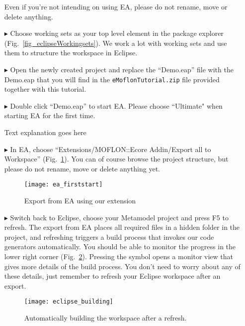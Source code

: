 \begin{enumerate}
\vspace{1cm}
Even if you're not intending on using EA, please do not rename, move or delete anything.

\FloatBarrier
\item[$\blacktriangleright$] Choose working sets as your top level element in the package explorer (Fig.~\ref{fig_eclipseWorkingsets}).
We work a lot with working sets and use them to structure the workspace in Eclipse.

\item[$\blacktriangleright$] Open the newly created project and replace the ``Demo.eap'' file with the Demo.eap that you will find in the \texttt{eMoflonTutorial.zip} file provided together with this tutorial.

\item[$\blacktriangleright$] Double click ``Demo.eap'' to start EA.
Please choose ``Ultimate" when starting EA for the first time.

\newpage
\texHeader
Text explanation goes here
\pagebreak

\visHeader
  
\item[$\blacktriangleright$] In EA, choose ``Extensions/MOFLON::Ecore Addin/Export\- all\- to\- Workspace'' (Fig.~\ref{fig_ea}).
You can of course browse the project structure, but please do not rename, move or delete anything yet.

\begin{figure}[htbp]
	\centering
  \texttt{[image: ea\_firststart]}
	\caption{Export from EA using our extension} 
	\label{fig_ea} 
\end{figure}


\visHeader
\item[$\blacktriangleright$] Switch back to Eclipse, choose your Metamodel project and press F5 to refresh.
The export from EA places all required files in a hidden folder in the project, and refreshing triggers a build process that invokes our code generators automatically.
You should be able to monitor the progress in the lower right corner (Fig.~\ref{fig_eclipsebuilding}).  
Pressing the symbol opens a monitor view that gives more details of the build process. 
You don't need to worry about any of these details, just remember to refresh your Eclipse workspace after an export.
\begin{figure}[htbp]
	\centering
  \texttt{[image: eclipse\_building]}
	\caption{Automatically building the workspace after a refresh.}
	\label{fig_eclipsebuilding}
\end{figure}

\end{enumerate}

